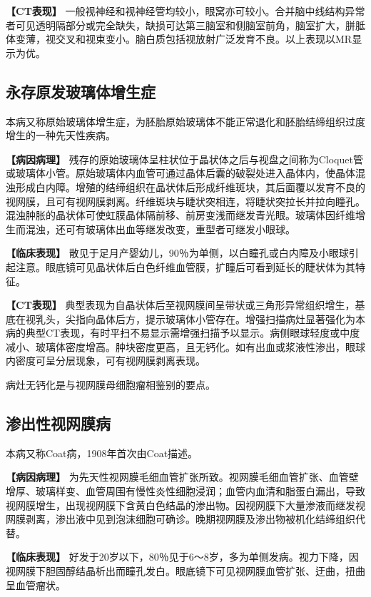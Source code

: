 \textbf{【CT表现】}
一般视神经和视神经管均较小，眼窝亦可较小。合并脑中线结构异常者可见透明隔部分或完全缺失，缺损可达第三脑室和侧脑室前角，脑室扩大，胼胝体变薄，视交叉和视束变小。脑白质包括视放射广泛发育不良。以上表现以MR显示为优。

\subsection{永存原发玻璃体增生症}

本病又称原始玻璃体增生症，为胚胎原始玻璃体不能正常退化和胚胎结缔组织过度增生的一种先天性疾病。

\textbf{【病因病理】}
残存的原始玻璃体呈柱状位于晶状体之后与视盘之间称为Cloquet管或玻璃体小管。原始玻璃体内血管可通过晶体后囊的破裂处进入晶体内，使晶体混浊形成白内障。增殖的结缔组织在晶状体后形成纤维斑块，其后面覆以发育不良的视网膜，且可有视网膜剥离。纤维斑块与睫状突相连，将睫状突拉长并拉向瞳孔。混浊肿胀的晶状体可使虹膜晶体隔前移、前房变浅而继发青光眼。玻璃体因纤维增生而混浊，还可有玻璃体出血等继发改变，重型者可继发小眼球。

\textbf{【临床表现】}
散见于足月产婴幼儿，90％为单侧，以白瞳孔或白内障及小眼球引起注意。眼底镜可见晶状体后白色纤维血管膜，扩瞳后可看到延长的睫状体为其特征。

\textbf{【CT表现】}
典型表现为自晶状体后至视网膜间呈带状或三角形异常组织增生，基底在视乳头，尖指向晶体后方，提示玻璃体小管存在。增强扫描病灶显著强化为本病的典型CT表现，有时平扫不易显示需增强扫描予以显示。病侧眼球轻度或中度减小、玻璃体密度增高。肿块密度更高，且无钙化。如有出血或浆液性渗出，眼球内密度可呈分层现象，可有视网膜剥离表现。

病灶无钙化是与视网膜母细胞瘤相鉴别的要点。

\subsection{渗出性视网膜病}

本病又称Coat病，1908年首次由Coat描述。

\textbf{【病因病理】}
为先天性视网膜毛细血管扩张所致。视网膜毛细血管扩张、血管壁增厚、玻璃样变、血管周围有慢性炎性细胞浸润；血管内血清和脂蛋白漏出，导致视网膜增生，出现视网膜下含黄白色结晶的渗出物。因视网膜下大量渗液而继发视网膜剥离，渗出液中见到泡沫细胞可确诊。晚期视网膜及渗出物被机化结缔组织代替。

\textbf{【临床表现】}
好发于20岁以下，80％见于6～8岁，多为单侧发病。视力下降，因视网膜下胆固醇结晶析出而瞳孔发白。眼底镜下可见视网膜血管扩张、迂曲，扭曲呈血管瘤状。

